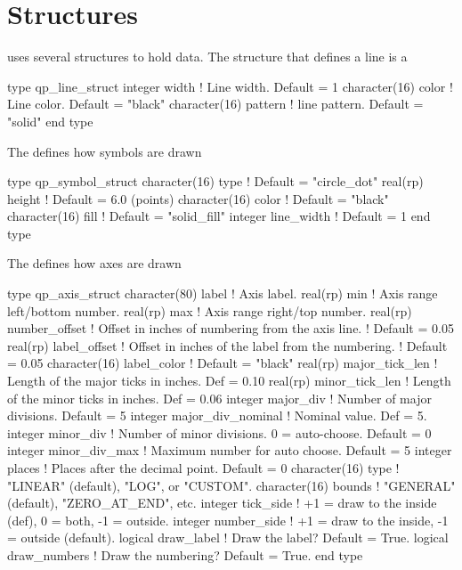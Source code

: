 \section{Structures}
\label{s:qp.structs}

\quickplot uses several structures to hold data. The structure that
defines a line is a 
\begin{example}
  type qp_line_struct
    integer width         ! Line width.   Default = 1
    character(16) color   ! Line color.   Default = "black"
    character(16) pattern ! line pattern. Default = "solid"
  end type
\end{example}

The  defines how symbols are drawn 
\begin{example}
  type qp_symbol_struct
    character(16)  type        ! Default = "circle_dot"
    real(rp) height            ! Default = 6.0 (points)
    character(16)  color       ! Default = "black"
    character(16)  fill        ! Default = "solid_fill"
    integer  line_width        ! Default = 1
  end type
\end{example}

The  defines how axes are drawn 
\begin{example}
  type qp_axis_struct
    character(80) label       ! Axis label.
    real(rp) min              ! Axis range left/bottom number.
    real(rp) max              ! Axis range right/top number.
    real(rp) number_offset    ! Offset in inches of numbering from the axis line. 
                              !  Default = 0.05
    real(rp) label_offset     ! Offset in inches of the label from the numbering.
                              !  Default = 0.05
    character(16) label_color ! Default = "black"
    real(rp) major_tick_len   ! Length of the major ticks in inches. Def = 0.10
    real(rp) minor_tick_len   ! Length of the minor ticks in inches. Def = 0.06
    integer major_div         ! Number of major divisions. Default = 5
    integer major_div_nominal ! Nominal value. Def = 5.
    integer minor_div         ! Number of minor divisions. 0 = auto-choose. Default = 0
    integer minor_div_max     ! Maximum number for auto choose. Default = 5
    integer places            ! Places after the decimal point. Default = 0
    character(16) type        ! "LINEAR" (default), "LOG", or "CUSTOM".
    character(16) bounds      ! "GENERAL" (default), "ZERO_AT_END", etc.
    integer tick_side         ! +1 = draw to the inside (def), 0 = both, -1 = outside.
    integer number_side       ! +1 = draw to the inside, -1 = outside (default).
    logical draw_label        ! Draw the label? Default = True.
    logical draw_numbers      ! Draw the numbering? Default = True.
  end type
\end{example}

